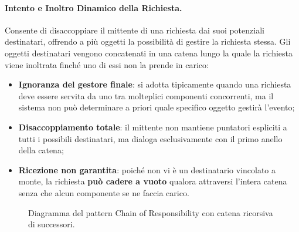\documentclass[12pt]{extarticle}
\newcommand{\cn}[1]{\makebox[\linewidth][c]{\textbf{#1}}}
\begin{document}
\paragraph{Intento e Inoltro Dinamico della Richiesta.}
Consente di disaccoppiare il mittente di una richiesta dai suoi potenziali destinatari, offrendo a più oggetti la possibilità di gestire la richiesta stessa. Gli oggetti destinatari vengono concatenati in una catena lungo la quale la richiesta viene inoltrata finché uno di essi non la prende in carico:
\begin{itemize}
    \item \textbf{Ignoranza del gestore finale}: si adotta tipicamente quando una richiesta deve essere servita da uno tra molteplici componenti concorrenti, ma il sistema non può determinare a priori quale specifico oggetto gestirà l'evento;
    \item \textbf{Disaccoppiamento totale}: il mittente non mantiene puntatori espliciti a tutti i possibili destinatari, ma dialoga esclusivamente con il primo anello della catena;
    \item \textbf{Ricezione non garantita}: poiché non vi è un destinatario vincolato a monte, la richiesta \textbf{può cadere a vuoto} qualora attraversi l'intera catena senza che alcun componente se ne faccia carico.
\end{itemize}

\begin{figure}[htbp]
\centering
{}
\caption{Diagramma del pattern Chain of Responsibility con catena ricorsiva di successori.}
\label{fig:pattern_cor_structure}
\end{figure}
\end{document}
